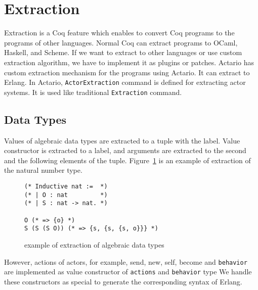 \section{Extraction}
\label{sec:extraction}

Extraction is a Coq feature which enables to convert Coq programs to the programs of other languages.
Normal Coq can extract programs to OCaml, Haskell, and Scheme.
If we want to extract to other languages or use custom extraction algorithm, we have to implement it as plugins or patches.
Actario has custom extraction mechanism for the programs using Actario.
It can extract to Erlang.
In Actario, \lstinline|ActorExtraction| command is defined for extracting actor systems.
It is used like traditional \lstinline|Extraction| command.

\subsection{Data Types}

Values of algebraic data types are extracted to a tuple with the label.
Value constructor is extracted to a label, and arguments are extracted to the second and the following elements of the tuple.
Figure~\ref{coq:adt} is an example of extraction of the natural number type.

\begin{figure}[t]
\begin{lstlisting}
(* Inductive nat :=  *)
(* | O : nat         *)
(* | S : nat -> nat. *)

O (* => {o} *)
S (S (S O)) (* => {s, {s, {s, o}}} *)
\end{lstlisting}
\caption{example of extraction of algebraic data types}\label{coq:adt}
\end{figure}

However, actions of actors, for example, \textsf{send}, \textsf{new}, \textsf{self}, \textsf{become} and \texttt{behavior} are implemented as value constructor of \texttt{actions} and \texttt{behavior} type
We handle these constructors as special to generate the corresponding syntax of Erlang.


